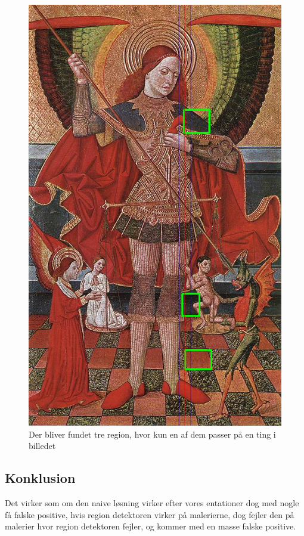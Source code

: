 \begin{figure}[h!!]
	\begin{center}
		\includegraphics[scale=0.3,angle=0]{afsnit/afprovning/billeder/naive_losning/naiv_virker_ikke3.png}
	\end{center}
	\caption[]{Der bliver fundet tre region, hvor kun en af dem passer
	på en ting i billedet}
	\label{naiv_virker_ikke3}
\end{figure}
\clearpage

\subsection{Konklusion}
Det virker som om den naive løsning virker efter vores entationer dog
med nogle få falske positive, hvis region detektoren virker på
malerierne, dog fejler den på malerier hvor region detektoren fejler, og
kommer med en masse falske positive.
